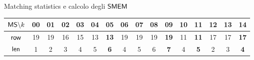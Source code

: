 \documentclass[]{beamer}
\def\len{\mbox{\rm {\sf len}}}
\def\row{\mbox{\rm {\sf row}}}
\def\MS{\mbox{\rm {\sf MS}}}
\def\SMEM{\mbox{\rm {\sf SMEM}}}
\begin{document}
\begin{frame}{Matching statistics e calcolo degli $\SMEM$}
\begin{table}[H]
    \begin{tabular}{c|ccccccccccccccc}
      $\MS\backslash k$ & 00 & 01 & 02 & 03 & 04 & {\color{nordcyan}\textbf{05}} & 06 & 07 & 08
      &  {\color{nordred}\textbf{09}} & 10 & {\color{nordgreen}\textbf{11}} & 12 & 13
      &  {\color{nordpurple}\textbf{14}} \\
      \hline
      $\row$ & 19 & 19 & 16 & 15 & 13 & {\color{nordcyan}\textbf{13}} & 19 & 19 & 19
      &  {\color{nordred}\textbf{19}} & 11 & {\color{nordgreen}\textbf{11}} & 17 & 17
      &  {\color{nordpurple}\textbf{17}} \\
      $\len$ & 1 & 2 & 3 & 4 & 5 & {\color{nordcyan}\textbf{6}} & 4 & 5 & 6
      & {\color{nordred}\textbf{7}} & 4 & {\color{nordgreen}\textbf{5}} & 2 & 3
      & {\color{nordpurple}\textbf{4}}\\
    \end{tabular}
  \end{table}
\end{frame}
\end{document}
